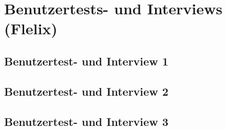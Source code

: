 \chapter{Benutzertests- und Interviews (Flelix)}
\label{chap:flinterviews}

	\section{Benutzertest- und Interview 1}
	\label{sec:flinterview1}
	
	\section{Benutzertest- und Interview 2}
	\label{sec:flinterview2}
	
	\section{Benutzertest- und Interview 3}
	\label{sec:flinterview3}
